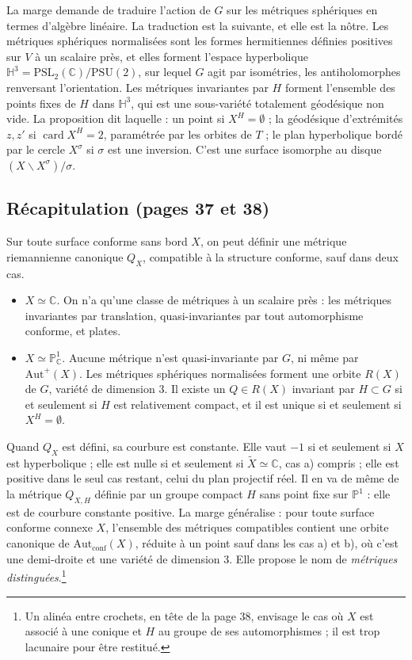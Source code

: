 \documentclass[11pt,a4paper]{article}
\begin{document}
La marge demande de traduire l'action de $G$ sur les métriques sphériques en
termes d'algèbre linéaire. La traduction est la suivante, et elle est la
nôtre. Les métriques sphériques normalisées sont les formes hermitiennes
définies positives sur $V$ à un scalaire près, et elles forment l'espace
hyperbolique $\mathbb{H}^{3} = \mathrm{PSL}_2(\mathbb{C})/\mathrm{PSU}(2)$,
sur lequel $G$ agit par isométries, les antiholomorphes renversant
l'orientation. Les métriques invariantes par $H$ forment l'ensemble des
points fixes de $H$ dans $\mathbb{H}^{3}$, qui est une sous-variété totalement
géodésique non vide. La proposition dit laquelle : un point si
$X^{H} = \emptyset$ ; la géodésique d'extrémités $z, z'$ si
$\operatorname{card} X^{H} = 2$, paramétrée par les orbites de $T$ ; le plan
hyperbolique bordé par le cercle $X^{\sigma}$ si $\sigma$ est une inversion.
C'est une surface isomorphe au disque $(X \smallsetminus X^{\sigma})/\sigma$.

\subsection*{Récapitulation (pages 37 et 38)}

Sur toute surface conforme sans bord $X$, on peut définir une métrique
riemannienne canonique $Q_X$, compatible à la structure conforme, sauf dans
deux cas.

\begin{itemize}
  \item[a)] $X \simeq \mathbb{C}$. On n'a qu'une classe de métriques à un
  scalaire près : les métriques invariantes par translation, quasi-invariantes
  par tout automorphisme conforme, et plates.
  \item[b)] $X \simeq \mathbb{P}^{1}_{\mathbb{C}}$. Aucune métrique n'est
  quasi-invariante par $G$, ni même par $\mathrm{Aut}^{+}(X)$. Les métriques
  sphériques normalisées forment une orbite $R(X)$ de $G$, variété de
  dimension $3$. Il existe un $Q \in R(X)$ invariant par $H \subset G$ si et
  seulement si $H$ est relativement compact, et il est unique si et seulement
  si $X^{H} = \emptyset$.
\end{itemize}

Quand $Q_X$ est défini, sa courbure est constante. Elle vaut $-1$ si et
seulement si $X$ est hyperbolique ; elle est nulle si et seulement si
$\widetilde{X} \simeq \mathbb{C}$, cas a) compris ; elle est positive dans le
seul cas restant, celui du plan projectif réel. Il en va de même de la
métrique $Q_{X,H}$ définie par un groupe compact $H$ sans point fixe sur
$\mathbb{P}^{1}$ : elle est de courbure constante positive. La marge
généralise : pour toute surface conforme connexe $X$, l'ensemble des métriques
compatibles contient une orbite canonique de $\mathrm{Aut}_{\mathrm{conf}}(X)$,
réduite à un point sauf dans les cas a) et b), où c'est une demi-droite et
une variété de dimension $3$. Elle propose le nom de \emph{métriques
distinguées}.\footnote{Un alinéa entre crochets, en tête de la page 38,
envisage le cas où $X$ est associé à une conique et $H$ au groupe de ses
automorphismes ; il est trop lacunaire pour être restitué.}
\end{document}
